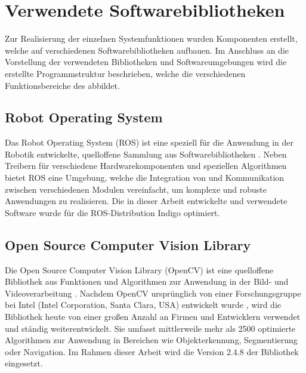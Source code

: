 \section{Verwendete Softwarebibliotheken}
Zur Realisierung der einzelnen Systemfunktionen wurden Komponenten erstellt, welche auf verschiedenen Softwarebibliotheken aufbauen.
Im Anschluss an die Vorstellung der verwendeten Bibliotheken und Softwareumgebungen wird die erstellte Programmstruktur beschrieben, welche die verschiedenen Funktionsbereiche des  abbildet.

\subsection{Robot Operating System}
\label{chap:ros}
Das Robot Operating System (ROS) ist eine speziell für die Anwendung in der Robotik entwickelte, quelloffene Sammlung aus Softwarebibliotheken \cite{ROS}. Neben Treibern für verschiedene Hardwarekomponenten und speziellen Algorithmen bietet ROS eine Umgebung, welche die Integration von und Kommunikation zwischen verschiedenen Modulen vereinfacht, um komplexe und robuste Anwendungen zu realisieren. Die in dieser Arbeit entwickelte und verwendete Software wurde für die ROS-Distribution Indigo optimiert.


\subsection{Open Source Computer Vision Library}
Die Open Source Computer Vision Library (OpenCV) ist eine quelloffene Bibliothek aus Funktionen und Algorithmen zur Anwendung in der Bild- und Videoverarbeitung \cite{OpenCV}. Nachdem OpenCV ursprünglich von einer Forschungsgruppe bei Intel (Intel Corporation, Santa Clara, USA) entwickelt wurde \cite{Laganiere2011}, wird die Bibliothek heute von einer großen Anzahl an Firmen und Entwicklern verwendet und ständig weiterentwickelt. Sie umfasst mittlerweile mehr als \SI{2500}{} optimierte Algorithmen zur Anwendung in Bereichen wie Objekterkennung, Segmentierung oder Navigation. Im Rahmen dieser Arbeit wird die Version 2.4.8 der Bibliothek eingesetzt.

